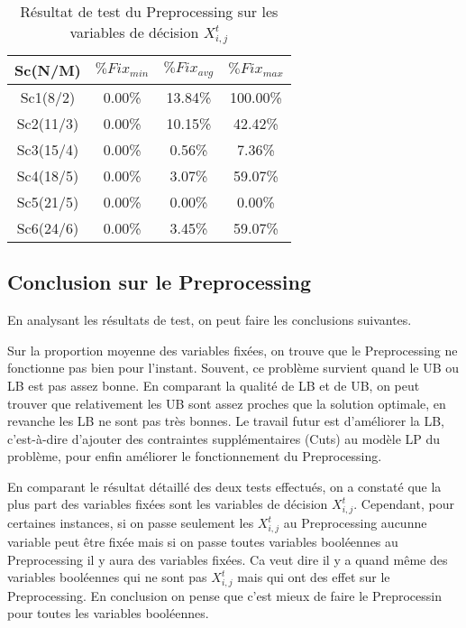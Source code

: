 \documentclass[twoside,fleqn]{EPURapport}
\begin{document}
\begin{table}[h]
    \centering
    \begin{tabular}{|c|c|c|c|}
    	\hline
    	Sc(N/M)	&  $\%Fix_{min}$ & $\%Fix_{avg}$ & $\%Fix_{max}$\\ \hline
    	Sc1(8/2) &0.00\% & 13.84\% & 100.00\%\\ \hline
Sc2(11/3)&0.00\% & 10.15\% & 42.42\%\\ \hline
Sc3(15/4)&0.00\% & 0.56\%  &7.36\%\\ \hline
Sc4(18/5)&0.00\% & 3.07\%  &59.07\%\\ \hline
Sc5(21/5)&0.00\% & 0.00\%  &0.00\%\\ \hline
Sc6(24/6)&0.00\% & 3.45\%  &59.07\%\\ \hline
    \end{tabular}
    \label{tab_pre_x}
    \caption{Résultat de test du Preprocessing sur les variables de décision $X^t_{i,j}$}
\end{table}
\bigskip


\subsection{Conclusion sur le Preprocessing}
En analysant les résultats de test, on peut faire les conclusions suivantes.


Sur la proportion moyenne des variables fixées, on trouve que le Preprocessing ne fonctionne pas bien pour l'instant. Souvent, ce problème survient quand le UB ou LB est pas assez bonne. En comparant la qualité de LB et de UB, on peut trouver que relativement les UB sont assez proches que la solution optimale, en revanche les LB ne sont pas très bonnes. Le travail futur est d'améliorer la LB, c'est-à-dire d'ajouter des contraintes supplémentaires (Cuts) au modèle LP du problème, pour enfin améliorer le fonctionnement du Preprocessing.


En comparant le résultat détaillé des deux tests effectués, on a constaté que la plus part des variables fixées sont les variables de décision $X^t_{i,j}$. Cependant, pour certaines instances, si on passe seulement les $X^t_{i,j}$ au Preprocessing aucunne variable peut être fixée mais si on passe toutes variables booléennes au Preprocessing il y aura des variables fixées. Ca veut dire il y a quand même des variables booléennes qui ne sont pas $X^t_{i,j}$ mais qui ont des effet sur le Preprocessing. En conclusion on pense que c'est mieux de faire le Preprocessin pour toutes les variables booléennes.
\end{document}
